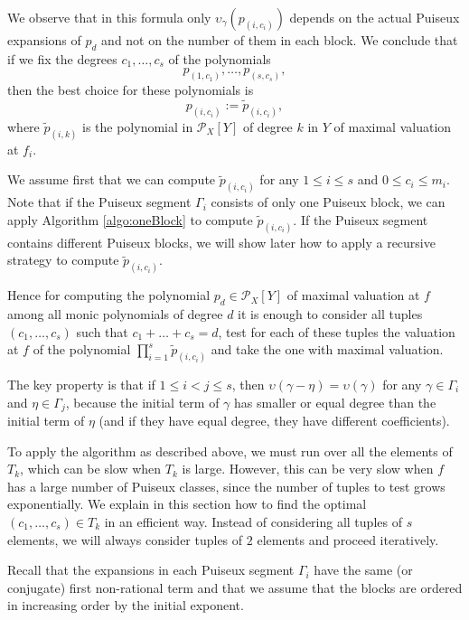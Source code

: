 \documentclass[a4paper,11pt]{amsart}%
\theoremstyle{definition}
\theoremstyle{plain}
\theoremstyle{remark}
\begin{document}
We observe that in this formula only $\upsilon_{\gamma}(p_{(i,c_i)})$ depends on the actual Puiseux expansions of $p_d$ and not on the number of them in each block. We conclude that if we fix the degrees $c_1, \dots, c_s$ of the polynomials
$$p_{(1, c_1)}, \dots, p_{(s, c_s)},$$
 then the best choice for these polynomials is $$p_{(i, c_i)} := \tilde p_{(i, c_i)},$$
where $\tilde p_{(i, k)}$ is the polynomial in $\mathcal{P}_{X}[Y]$ of degree $k$ in $Y$ of maximal valuation at $f_i$.

We assume first that we can compute $\tilde p_{(i, c_i)}$ for any $1 \le i \le s$ and $0 \le c_i \le m_i$. Note that if the Puiseux segment $\Gamma_i$ consists of only one Puiseux block, we can apply Algorithm \ref{algo:oneBlock} to compute $\tilde p_{(i, c_i)}$.
If the Puiseux segment contains different Puiseux blocks, we will show later how to apply a recursive strategy to compute $\tilde p_{(i, c_i)}$.


Hence for computing the polynomial $p_d \in {\mathcal{P}_{X}}[Y]$ of maximal valuation at $f$ among all monic polynomials of degree $d$ it is enough to consider all tuples $(c_1, \dots, c_s)$ such that $c_1 + \dots + c_s = d$, test for each of these tuples the valuation at $f$ of the polynomial $\prod_{i=1}^s \tilde p_{(i, c_i)}$ and take the one with maximal valuation.

The key
property is that if $1 \leq i < j \leq s$, then $\upsilon(\gamma - \eta) =
\upsilon(\gamma)$ for any $\gamma \in\Gamma_{i}$ and $\eta \in \Gamma_{j}$, because the initial term of $\gamma$ has smaller or equal degree than the initial term of $\eta$ (and if they have equal degree, they have different coefficients).


To apply the algorithm as described above, we must run over all the elements
of $T_{k}$, which can be slow when $T_{k}$ is large. However, this can be very slow when $f$ has a large number of Puiseux classes, since the number of tuples to test grows exponentially.
We explain in this section how to find the optimal $(c_{1}, \dots, c_{s}) \in T_{k}$ in an
efficient way. Instead of considering all tuples of $s$ elements, we will always
consider tuples of $2$ elements and proceed iteratively.

Recall that the expansions in each Puiseux segment $\Gamma_i$ have the same (or conjugate)
first non-rational term and that we assume that the blocks are ordered in increasing order
by the initial exponent.
\end{document}

